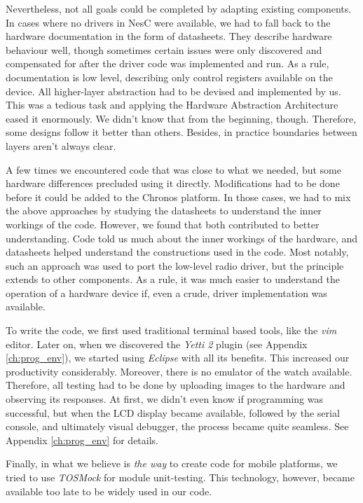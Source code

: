 Nevertheless, not all goals could be completed by adapting existing components. In cases where no drivers in NesC were available, we had to fall back to the hardware documentation in the form of datasheets. They describe hardware behaviour well, though sometimes certain issues were only discovered and compensated for after the driver code was implemented and run. As a rule, documentation is low level, describing only control registers available on the device. All higher-layer  abstraction had to be devised and implemented by us. This was a tedious task and applying the Hardware Abstraction Architecture eased it enormously. We didn't know that from the beginning, though. Therefore, some designs follow it better than others. Besides, in practice boundaries between layers aren't always clear.

A few times we encountered code that was close to what we needed, but some hardware differences precluded using it directly. Modifications had to be done before it could be added to the Chronos platform. In those cases, we had to mix the above approaches by studying the datasheets to understand the inner workings of the code. However, we found that both contributed to better understanding. Code told us much about the inner workings of the hardware, and datasheets helped understand the constructions used in the code. Most notably, such an approach was used to port the low-level radio driver, but the principle extends to other components. As a rule, it was much easier to understand the operation of a hardware device if, even a crude, driver implementation was available.

To write the code, we first used traditional terminal based tools, like the \emph{vim} editor. Later on, when we discovered the \emph{Yetti 2} plugin (see Appendix \ref{ch:prog_env}), we started using \emph{Eclipse} with all its benefits. This increased our productivity considerably. Moreover, there is no emulator of the watch available. Therefore, all testing had to be done by uploading images to the hardware and observing its responses. At first, we didn't even know if programming was successful, but when the LCD display became available, followed by the serial console, and ultimately visual debugger, the process became quite seamless. See Appendix \ref{ch:prog_env} for details.

Finally, in what we believe is \emph{the way} to create code for mobile platforms, we tried to use \emph{TOSMock} \cite{TOSMock} for module unit-testing. This technology, however, became available too late to be widely used in our code.

